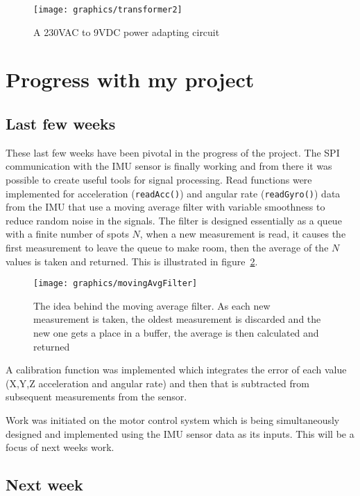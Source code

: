 \documentclass[11pt,a4paper,titlepage]{article}
\begin{document}
	\begin{figure}[H]
		\centering
		\texttt{[image: graphics/transformer2]}
		\caption{A 230VAC to 9VDC power adapting circuit}
		\label{fig:transformer}
	\end{figure}
	
	\pagebreak
	\section{Progress with my project}
	
	\subsection{Last few weeks}
	
	These last few weeks have been pivotal in the progress of the project. The SPI communication with the IMU sensor is finally working and from there it was possible to create useful tools for signal processing.
	Read functions were implemented for acceleration (\verb|readAcc()|) and angular rate (\verb|readGyro()|) data from the IMU that use a moving average filter with variable smoothness to reduce random noise in the signals.
	The filter is designed essentially as a queue with a finite number of spots $N$, when a new measurement is read, it causes the first measurement to leave the queue to make room, then the average of the $N$ values is taken and returned. This is illustrated in figure~\ref{fig:movingavg}.
	 
	 \begin{figure}[H]
		\centering
		\texttt{[image: graphics/movingAvgFilter]}
		\caption{The idea behind the moving average filter. As each new measurement is taken, the oldest measurement is discarded and the new one gets a place in a buffer, the average is then calculated and returned}
		\label{fig:movingavg}
	 \end{figure}
	 
	  \noindent A calibration function was implemented which integrates the error of each value (X,Y,Z acceleration and angular rate) and then that is subtracted from subsequent measurements from the sensor.
	  
	  \noindent Work was initiated on the motor control system which is being simultaneously designed and implemented using the IMU sensor data as its inputs. This will be a focus of next weeks work. 

	\subsection{Next week}
	
\end{document}
